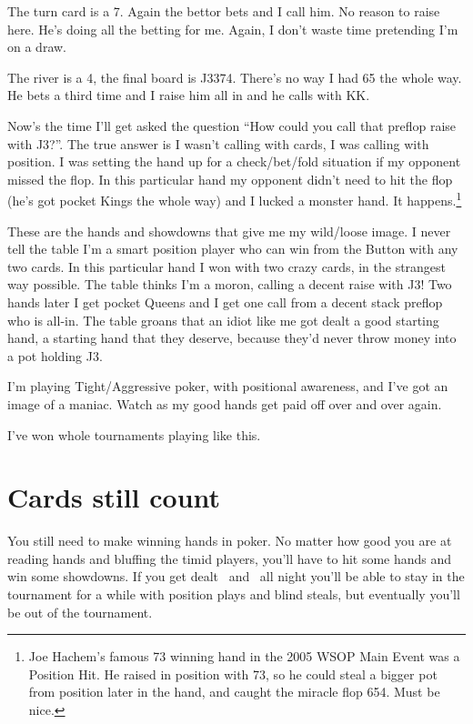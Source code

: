 The turn card is a 7. Again the bettor bets and I call him.
No reason to raise here. He's doing all the betting for me. Again,
I don't waste time pretending I'm on a draw.

The river is a 4, the final board is J3374. There's no way I had 65
the whole way. He bets a third time and I raise him all in and he
calls with KK.

Now's the time I'll get asked the question ``How could you call that
preflop raise with J3?''. The true answer is I wasn't calling with
cards, I was calling with position. I was setting the hand up for
a check/bet/fold situation if my opponent missed the flop. In this
particular hand my opponent didn't need to hit the flop (he's got pocket
Kings the whole way) and I lucked a monster hand.
It happens.\footnote{Joe Hachem's famous 73 winning hand in the 2005
WSOP Main Event was a Position Hit. He raised in position with 73, so
he could steal a bigger pot from position later in the hand, and caught
the miracle flop 654. Must be nice.}

These are the hands and showdowns that give me my wild/loose image.
I never tell the table I'm a smart position player who can
win from the Button with any two cards. In this particular hand I
won with two crazy cards, in the strangest way possible. The table
thinks I'm a moron, calling a decent raise with J3! Two hands later I get
pocket Queens and I get one call from a decent stack preflop who is all-in.
The table groans that an idiot like me got dealt a good
starting hand, a starting hand that they deserve, because they'd never
throw money into a pot holding J3.

I'm playing Tight/Aggressive poker, with positional awareness,
and I've got an image of a maniac. Watch as my good hands get paid
off over and over again.

I've won whole tournaments playing like this.

\section{Cards still count}

You still need to make winning hands in poker. No matter how good you
are at reading hands and bluffing the timid players, you'll have to
hit some hands and win some showdowns. If you get dealt
\tenh\twoc\ and \Qh\fivec\ all night you'll be able to stay in
the tournament for a while with position plays and blind steals,
but eventually you'll be out of the tournament.

